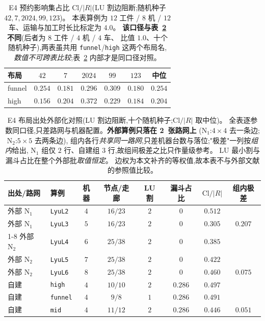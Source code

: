 \documentclass[manuscript,screen,review]{acmart}
\newcommand{\NPubNets}{2}
\newcommand{\PubCloSpread}{0.207}
\newcommand{\PubCloSpreadBig}{0.075}
\newcommand{\SelfCloSpread}{0.051}
\begin{document}
\begin{table}[t]
\centering
\caption{E4 预约影响集占比 \(\mathrm{Cl}/|R|\)(LU 割边阻断;随机种子 \(42,7,2024,99,123\))。
本表算例为 \(12\) 工件 / \(8\) 机 / \(12\) 车、运输与加工时长比标定为 \(4.0\)。
\textbf{该口径与表~\ref{tab:e4pub} 不同}(后者为 \(8\) 工件 / \(4\) 机 / \(4\) 车、
比值 \(1.0\)、十个随机种子),两表虽共用 \texttt{funnel}/\texttt{high} 这两个布局名,
\emph{数值不可跨表比较};表~\ref{tab:e4pub} 内部才是同口径对照。}
\label{tab:e4}
\small
\begin{tabular}{@{}lcccccc@{}}
\toprule
布局 & \(42\) & \(7\) & \(2024\) & \(99\) & \(123\) & 中位 \\
\midrule
funnel & \(0.254\) & \(0.181\) & \(0.296\) & \(0.309\) & \(0.180\) & \(0.254\) \\
high & \(0.156\) & \(0.204\) & \(0.372\) & \(0.229\) & \(0.184\) & \(0.204\) \\
\bottomrule
\end{tabular}
\end{table}

\begin{table}[t]
\centering
\caption{E4 布局出处外部化对照(LU 割边阻断,十个随机种子;\(\mathrm{Cl}/|R|\) 取中位)。
全表逐参数同口径,只差路网与机器配置。\textbf{外部算例只落在 \NPubNets\ 张路网上}
(\(\mathrm{N}_1\):\(4\times 4\) 去一条边;\(\mathrm{N}_2\):\(5\times 5\) 去两条边),
组内各行\emph{共享同一路网},只差机器台数与落位;"极差"一列按\emph{组内}给出,
\(\mathrm{N}_1\) 组仅 \(2\) 行、自建组 \(3\) 行,故组间极差之比只作量级参考。
LU 最小割与漏斗占比在整个外部批\emph{取值恒定}。
边权为本文补齐的等权值,故本表不与外部文献的参照值比较。}
\label{tab:e4pub}
\small
\begin{tabular}{@{}llcccccc@{}}
\toprule
出处/路网 & 算例 & 机器 & 节点/走廊 & LU 割 & 漏斗占比 & \(\mathrm{Cl}/|R|\)
 & 组内极差 \\
\midrule
外部 \(\mathrm{N}_1\) & \texttt{LyuL2} & \(4\) & \(16/23\) & \(2\) & \(0\) & \(0.512\) & \\
外部 \(\mathrm{N}_1\) & \texttt{LyuL3} & \(5\) & \(16/23\) & \(2\) & \(0\) & \(0.305\)
  & \(\PubCloSpread\) \\
\cmidrule{1-8}
外部 \(\mathrm{N}_2\) & \texttt{LyuL4} & \(6\) & \(25/38\) & \(2\) & \(0\) & \(0.385\) & \\
外部 \(\mathrm{N}_2\) & \texttt{LyuL5} & \(7\) & \(25/38\) & \(2\) & \(0\) & \(0.422\) & \\
外部 \(\mathrm{N}_2\) & \texttt{LyuL6} & \(8\) & \(25/38\) & \(2\) & \(0\) & \(0.460\)
  & \(\PubCloSpreadBig\) \\
\midrule
自建 & \texttt{high} & \(4\) & \(10/10\) & \(2\) & \(0.286\) & \(0.497\) & \\
自建 & \texttt{funnel} & \(4\) & \(9/8\) & \(1\) & \(0.286\) & \(0.491\) & \\
自建 & \texttt{mid} & \(4\) & \(11/12\) & \(2\) & \(0.286\) & \(0.446\)
  & \(\SelfCloSpread\) \\
\bottomrule
\end{tabular}
\end{table}
\end{document}
